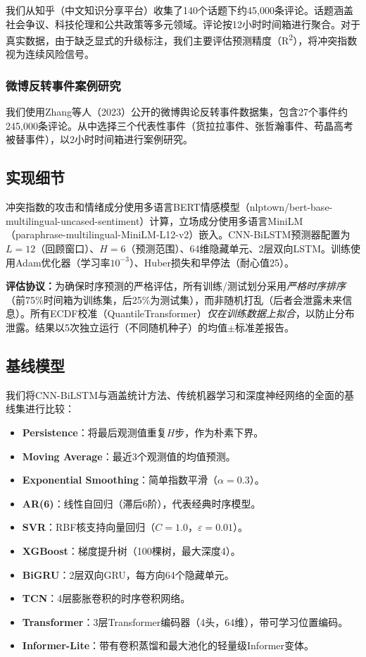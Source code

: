 \documentclass[conference]{IEEEtran}
\begin{document}
我们从知乎（中文知识分享平台）收集了140个话题下约45,000条评论。话题涵盖社会争议、科技伦理和公共政策等多元领域。评论按12小时时间箱进行聚合。对于真实数据，由于缺乏显式的升级标注，我们主要评估预测精度（R\textsuperscript{2}），将冲突指数视为连续风险信号。

\subsubsection{微博反转事件案例研究}

我们使用Zhang等人（2023）公开的微博舆论反转事件数据集，包含27个事件约245,000条评论。从中选择三个代表性事件（货拉拉事件、张哲瀚事件、苟晶高考被替事件），以2小时时间箱进行案例研究。

\subsection{实现细节}

冲突指数的攻击和情绪成分使用多语言BERT情感模型（nlptown/bert-base-multilingual-uncased-sentiment）计算，立场成分使用多语言MiniLM（paraphrase-multilingual-MiniLM-L12-v2）嵌入。CNN-BiLSTM预测器配置为$L{=}12$（回顾窗口）、$H{=}6$（预测范围）、64维隐藏单元、2层双向LSTM。训练使用Adam优化器（学习率$10^{-3}$）、Huber损失和早停法（耐心值25）。

\textbf{评估协议：}为确保时序预测的严格评估，所有训练/测试划分采用\emph{严格时序排序}（前75\%时间箱为训练集，后25\%为测试集），而非随机打乱（后者会泄露未来信息）。所有ECDF校准（QuantileTransformer）\emph{仅在训练数据上拟合}，以防止分布泄露。结果以5次独立运行（不同随机种子）的均值$\pm$标准差报告。

\subsection{基线模型}

我们将CNN-BiLSTM与涵盖统计方法、传统机器学习和深度神经网络的全面的基线集进行比较：

\begin{itemize}
\item \textbf{Persistence}：将最后观测值重复$H$步，作为朴素下界。
\item \textbf{Moving Average}：最近3个观测值的均值预测。
\item \textbf{Exponential Smoothing}：简单指数平滑（$\alpha{=}0.3$）。
\item \textbf{AR(6)}：线性自回归（滞后6阶），代表经典时序模型。
\item \textbf{SVR}：RBF核支持向量回归（$C{=}1.0$，$\varepsilon{=}0.01$）。
\item \textbf{XGBoost}：梯度提升树（100棵树，最大深度4）。
\item \textbf{BiGRU}：2层双向GRU，每方向64个隐藏单元。
\item \textbf{TCN}：4层膨胀卷积的时序卷积网络。
\item \textbf{Transformer}：3层Transformer编码器（4头，64维），带可学习位置编码。
\item \textbf{Informer-Lite}：带有卷积蒸馏和最大池化的轻量级Informer变体。
\end{itemize}
\end{document}
